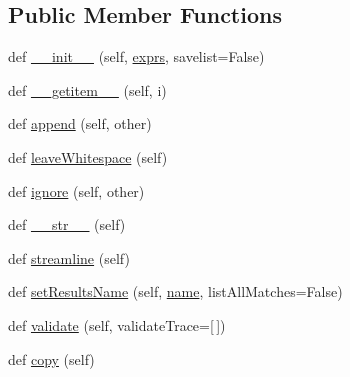 \subsection*{Public Member Functions}
\begin{DoxyCompactItemize}
\item 
def \hyperlink{classsetuptools_1_1__vendor_1_1pyparsing_1_1ParseExpression_a7cd8a69a2468f1ecdc5c1a8f89e22e91}{\+\_\+\+\_\+init\+\_\+\+\_\+} (self, \hyperlink{classsetuptools_1_1__vendor_1_1pyparsing_1_1ParseExpression_a4e2611e5f2c7118fb18cdc4a710bd3db}{exprs}, savelist=False)
\item 
def \hyperlink{classsetuptools_1_1__vendor_1_1pyparsing_1_1ParseExpression_a5079e3a5cb2780458d5a0c593c55aef3}{\+\_\+\+\_\+getitem\+\_\+\+\_\+} (self, i)
\item 
def \hyperlink{classsetuptools_1_1__vendor_1_1pyparsing_1_1ParseExpression_a00a06dce2e6acc41e3e59888494daaa5}{append} (self, other)
\item 
def \hyperlink{classsetuptools_1_1__vendor_1_1pyparsing_1_1ParseExpression_a69c2da4772c362e6312fda61129a50a5}{leave\+Whitespace} (self)
\item 
def \hyperlink{classsetuptools_1_1__vendor_1_1pyparsing_1_1ParseExpression_a48b65baaac85f3c2cb4c6e9335a6c8e8}{ignore} (self, other)
\item 
def \hyperlink{classsetuptools_1_1__vendor_1_1pyparsing_1_1ParseExpression_a2ebf0733124a2f792c5affb74c3133bc}{\+\_\+\+\_\+str\+\_\+\+\_\+} (self)
\item 
def \hyperlink{classsetuptools_1_1__vendor_1_1pyparsing_1_1ParseExpression_a268ecaecb08a2528c6bcb976e4ea7070}{streamline} (self)
\item 
def \hyperlink{classsetuptools_1_1__vendor_1_1pyparsing_1_1ParseExpression_a86baf0e35c0e87af7a2f41f7c14ecb25}{set\+Results\+Name} (self, \hyperlink{classsetuptools_1_1__vendor_1_1pyparsing_1_1ParserElement_aeff22f349cb2211b65b16b2eadc52ee5}{name}, list\+All\+Matches=False)
\item 
def \hyperlink{classsetuptools_1_1__vendor_1_1pyparsing_1_1ParseExpression_afd00af0802389bfdf4ece57c5b934ede}{validate} (self, validate\+Trace=\mbox{[}$\,$\mbox{]})
\item 
def \hyperlink{classsetuptools_1_1__vendor_1_1pyparsing_1_1ParseExpression_a89003b24141914059976d66bd492f161}{copy} (self)
\end{DoxyCompactItemize}
